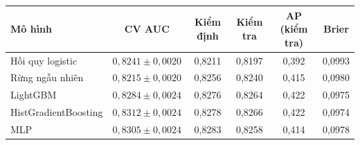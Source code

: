 \begin{tabular}{@{}lccccc@{}}
\toprule
\textbf{Mô hình} & \textbf{CV AUC} & \textbf{Kiểm định} & \textbf{Kiểm tra} & \textbf{AP (kiểm tra)} & \textbf{Brier}\\
\midrule
Hồi quy logistic & $0,8241\pm0,0020$ & 0,8211 & 0,8197 & 0,392 & 0,0993 \\
Rừng ngẫu nhiên & $0,8215\pm0,0020$ & 0,8256 & 0,8240 & 0,415 & 0,0980 \\
LightGBM & $0,8284\pm0,0024$ & 0,8276 & 0,8264 & 0,422 & 0,0975 \\
HistGradientBoosting & $0,8312\pm0,0024$ & 0,8278 & 0,8266 & 0,422 & 0,0974 \\
MLP & $0,8305\pm0,0024$ & 0,8283 & 0,8258 & 0,414 & 0,0978 \\
\bottomrule
\end{tabular}
